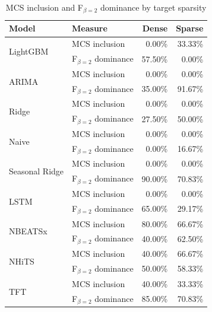 \begin{table}
\caption{MCS inclusion and F$_{\beta=2}$ dominance by target sparsity}
\begin{tabular}{llrr}
\toprule
Model & Measure & Dense & Sparse \\
\midrule
\multirow[t]{2}{*}{LightGBM} & MCS inclusion & 0.00\% & 33.33\% \\
 & F$_{\beta=2}$ dominance & 57.50\% & 0.00\% \\
\cline{1-4}
\multirow[t]{2}{*}{ARIMA} & MCS inclusion & 0.00\% & 0.00\% \\
 & F$_{\beta=2}$ dominance & 35.00\% & 91.67\% \\
\cline{1-4}
\multirow[t]{2}{*}{Ridge} & MCS inclusion & 0.00\% & 0.00\% \\
 & F$_{\beta=2}$ dominance & 27.50\% & 50.00\% \\
\cline{1-4}
\multirow[t]{2}{*}{Naive} & MCS inclusion & 0.00\% & 0.00\% \\
 & F$_{\beta=2}$ dominance & 0.00\% & 16.67\% \\
\cline{1-4}
\multirow[t]{2}{*}{Seasonal Ridge} & MCS inclusion & 0.00\% & 0.00\% \\
 & F$_{\beta=2}$ dominance & 90.00\% & 70.83\% \\
\cline{1-4}
\multirow[t]{2}{*}{LSTM} & MCS inclusion & 0.00\% & 0.00\% \\
 & F$_{\beta=2}$ dominance & 65.00\% & 29.17\% \\
\cline{1-4}
\multirow[t]{2}{*}{NBEATSx} & MCS inclusion & 80.00\% & 66.67\% \\
 & F$_{\beta=2}$ dominance & 40.00\% & 62.50\% \\
\cline{1-4}
\multirow[t]{2}{*}{NHiTS} & MCS inclusion & 40.00\% & 66.67\% \\
 & F$_{\beta=2}$ dominance & 50.00\% & 58.33\% \\
\cline{1-4}
\multirow[t]{2}{*}{TFT} & MCS inclusion & 40.00\% & 33.33\% \\
 & F$_{\beta=2}$ dominance & 85.00\% & 70.83\% \\
\cline{1-4}
\bottomrule
\end{tabular}
\end{table}
